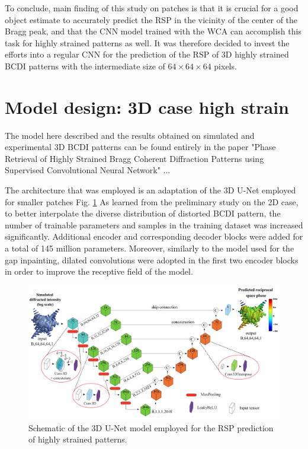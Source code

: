 To conclude, main finding of this study on patches is that it is crucial for a good object estimate to accurately predict 
the RSP in the vicinity of the center of the Bragg peak, and that the CNN model trained with the WCA can accomplish this task 
for highly strained patterns as well. It was therefore decided to invest the efforts into a regular CNN for the prediction 
of the RSP of 3D highly strained BCDI patterns with the intermediate size of $64\times64\times64$ pixels. 

\section{Model design: 3D case high strain }\label{chp:3d_nostrain}
The model here described and the results obtained on simulated and experimental 3D BCDI patterns can be found entirely 
in the paper "Phase Retrieval of Highly Strained Bragg Coherent Diffraction Patterns using Supervised Convolutional Neural Network" ... 

The architecture that was employed is an adaptation of the 3D U-Net employed for smaller patches Fig. \ref{fig:architecture_phasing}
As learned from the preliminary study on the 2D case, to better interpolate the diverse distribution of distorted BCDI pattern, 
the number of trainable parameters and samples in the training dataset was increased significantly. Additional encoder 
and corresponding decoder blocks were added for a total of 145 million parameters. Moreover, similarly to the model 
used for the gap inpainting, dilated convolutions were adopted in the first two encoder blocks in order to improve 
the receptive field of the model. 

\begin{figure}[H]
    \centering
    \includegraphics[width=\textwidth]{figures/Phasing/Architecture-1.pdf}
    \caption{Schematic of the 3D U-Net model employed for the RSP prediction of highly strained patterns.}
    \label{fig:architecture_phasing}
\end{figure}

